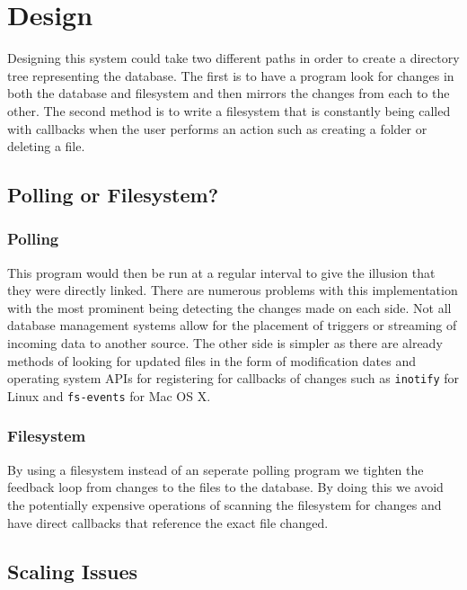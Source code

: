 \chapter{Design}

Designing this system could take two different paths in order to create a directory tree representing the database. The first is to have a program look for changes in both the database and filesystem and then mirrors the changes from each to the other. The second method is to write a filesystem that is constantly being called with callbacks when the user performs an action such as creating a folder or deleting a file.

\section{Polling or Filesystem?}

\subsection{Polling}

This program would then be run at a regular interval to give the illusion that they were directly linked. There are numerous problems with this implementation with the most prominent being detecting the changes made on each side. Not all database management systems allow for the placement of triggers or streaming of incoming data to another source. The other side is simpler as there are already methods of looking for updated files in the form of modification dates and operating system APIs for registering for callbacks of changes such as \texttt{inotify} for Linux and \texttt{fs-events} for Mac OS X.


\subsection{Filesystem}

By using a filesystem instead of an seperate polling program we tighten the feedback loop from changes to the files to the database. By doing this we avoid the potentially expensive operations of scanning the filesystem for changes and have direct callbacks that reference the exact file changed.

\section{Scaling Issues}

